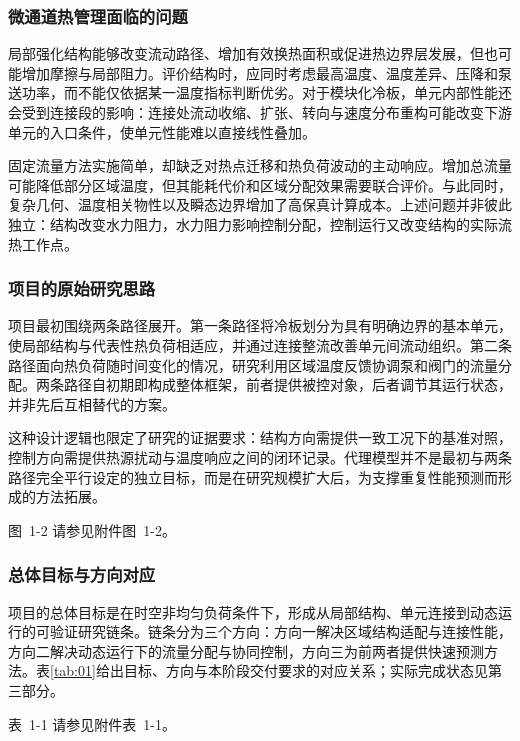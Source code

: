 \documentclass[UTF8]{midterm}
\makeatletter
\newcommand{\submissionnumber}[1]{\def\@currentlabel{#1}}
\makeatother
\begin{document}
\subsubsection{微通道热管理面临的问题}
局部强化结构能够改变流动路径、增加有效换热面积或促进热边界层发展，但也可能增加摩擦与局部阻力。评价结构时，应同时考虑最高温度、温度差异、压降和泵送功率，而不能仅依据某一温度指标判断优劣。对于模块化冷板，单元内部性能还会受到连接段的影响：连接处流动收缩、扩张、转向与速度分布重构可能改变下游单元的入口条件，使单元性能难以直接线性叠加。

固定流量方法实施简单，却缺乏对热点迁移和热负荷波动的主动响应。增加总流量可能降低部分区域温度，但其能耗代价和区域分配效果需要联合评价。与此同时，复杂几何、温度相关物性以及瞬态边界增加了高保真计算成本。上述问题并非彼此独立：结构改变水力阻力，水力阻力影响控制分配，控制运行又改变结构的实际流热工作点。

\subsubsection{项目的原始研究思路}
项目最初围绕两条路径展开。第一条路径将冷板划分为具有明确边界的基本单元，使局部结构与代表性热负荷相适应，并通过连接整流改善单元间流动组织。第二条路径面向热负荷随时间变化的情况，研究利用区域温度反馈协调泵和阀门的流量分配。两条路径自初期即构成整体框架，前者提供被控对象，后者调节其运行状态，并非先后互相替代的方案。

这种设计逻辑也限定了研究的证据要求：结构方向需提供一致工况下的基准对照，控制方向需提供热源扰动与温度响应之间的闭环记录。代理模型并不是最初与两条路径完全平行设定的独立目标，而是在研究规模扩大后，为支撑重复性能预测而形成的方法拓展。


\par\noindent \begingroup\submissionnumber{1-2}\label{fig:02}\endgroup 图~1-2 请参见附件图~1-2。\par


\subsubsection{总体目标与方向对应}
项目的总体目标是在时空非均匀负荷条件下，形成从局部结构、单元连接到动态运行的可验证研究链条。链条分为三个方向：方向一解决区域结构适配与连接性能，方向二解决动态运行下的流量分配与协同控制，方向三为前两者提供快速预测方法。表\ref{tab:01}给出目标、方向与本阶段交付要求的对应关系；实际完成状态见第三部分。

\par\noindent \begingroup\submissionnumber{1-1}\label{tab:01}\endgroup 表~1-1 请参见附件表~1-1。\par
\end{document}

